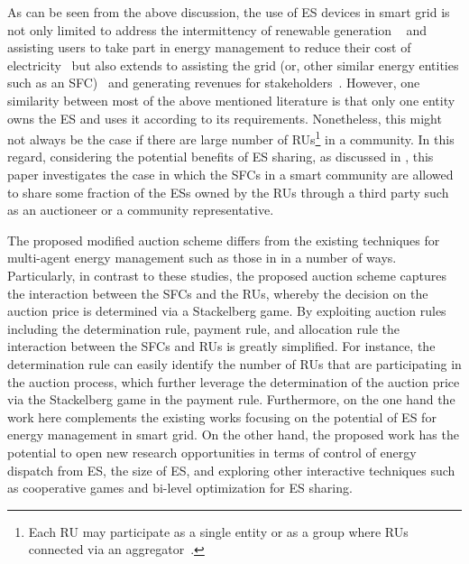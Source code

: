 \documentclass[journal,10pt]{IEEEtran}
\begin{document}
As can be seen from the above discussion, the use of ES devices in smart grid is not only limited to address the intermittency of renewable generation ~\cite{Denholm:2010} and assisting users to take part in energy management to reduce their cost of electricity~\cite{Cao:2004,Carpinelli-TSG:2013} but also extends to assisting the grid (or, other similar energy entities such as an SFC)~\cite{ZhenpoWang:2013} and generating revenues for stakeholders~\cite{Geth-PESGM:2010,Nukamp-JTSG:2013}. However, one similarity between most of the above mentioned literature is that only one entity owns the ES and uses it according to its requirements. Nonetheless, this might not always be the case if there are large number of RUs\footnote{Each RU may participate as a single entity or as a group where RUs connected via an aggregator~\cite{Wayes-J-TSG:2012}.} in a community. In this regard, considering the potential benefits of ES sharing, as discussed in \cite{Wang-JTSG:2013}, this paper investigates the case in which the SFCs in a smart community are allowed to share some fraction of the ESs owned by the RUs through a third party such as an auctioneer or a community representative.

The proposed modified auction scheme differs from the existing techniques for multi-agent energy management such as those in \cite{Tushar-TIE:2014,chaibo-TSG:2014,Maharjan-JTSG:2013} in a number of ways. Particularly, in contrast to these studies, the proposed auction scheme captures the interaction between the SFCs and the RUs, whereby the decision on the auction price is determined via a Stackelberg game. By exploiting auction rules including the determination rule, payment rule, and allocation rule the interaction between the SFCs and RUs is greatly simplified. For instance, the determination rule can easily identify the number of RUs that are participating in the auction process, which further leverage the determination of the auction price via the Stackelberg game in the payment rule. Furthermore, on the one hand the work here complements the existing works focusing on the potential of ES for energy management in smart grid. On the other hand, the proposed work has the potential to open new research opportunities in terms of  control of energy dispatch from ES, the size of ES, and exploring other interactive techniques such as cooperative games and bi-level optimization for ES sharing. 
\end{document}
